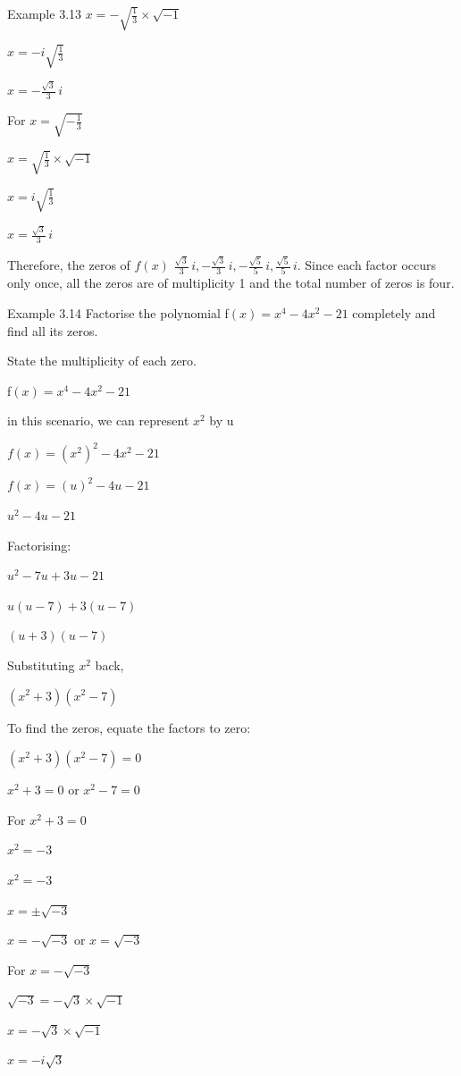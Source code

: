 \begin{example}{Example 3.13}
$x = -\sqrt{\frac{1}{3}} \times \sqrt{-1}$

$x = -i\sqrt{\frac{1}{3}}$

$x = -\frac{\sqrt{3}}{3}\,i$

For $x = \sqrt{-\frac{1}{3}}$

$x = \sqrt{\frac{1}{3}} \times \sqrt{-1}$

$x = i\sqrt{\frac{1}{3}}$

$x = \frac{\sqrt{3}}{3}\,i$

Therefore, the zeros of $f(x)$ $\frac{\sqrt{3}}{3}\,i, -\frac{\sqrt{3}}{3}\,i,
-\frac{\sqrt{5}}{5}\,i, \frac{\sqrt{5}}{5}\,i$. Since each factor occurs only once, all
the zeros are of multiplicity 1 and the total number of zeros is four.
\end{example}

\begin{example}{Example 3.14}
Factorise the polynomial f$(x) = x^4 - 4x^2 - 21$ completely and find all its zeros.

State the multiplicity of each zero.

\solution
f$(x) = x^4 - 4x^2 - 21$

in this scenario, we can represent $x^2$ by u

$f(x) = (x^2)^2 - 4x^2 - 21$

$f(x) = (u)^2 - 4u - 21$

$u^2 - 4u - 21$

Factorising:

$u^2 - 7u + 3u - 21$

$u(u - 7) + 3(u - 7)$

$(u + 3)(u - 7)$

Substituting $x^2$ back,

$(x^2 + 3)(x^2 - 7)$

To find the zeros, equate the factors to zero:

$(x^2 + 3)(x^2 - 7) = 0$

$x^2 + 3 = 0$ or $x^2 - 7 = 0$

For $x^2 + 3 = 0$

$x^2 = -3$

$x^2 = -3$

$x = \pm\sqrt{-3}$

$x = -\sqrt{-3}$ or $x = \sqrt{-3}$

For $x = -\sqrt{-3}$

$\sqrt{-3} = -\sqrt{3} \times \sqrt{-1}$

$x = -\sqrt{3} \times \sqrt{-1}$

$x = -i\sqrt{3}$


\end{example}
